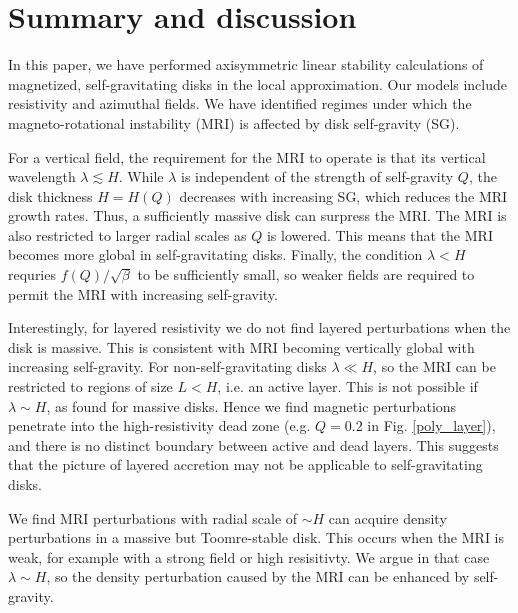 \section{Summary and discussion}\label{summary}
In this paper, we have performed axisymmetric linear stability
calculations of magnetized, self-gravitating disks in the local
approximation. Our models include resistivity and azimuthal fields.  
We have identified regimes under which the magneto-rotational
instability (MRI) is affected by disk self-gravity (SG).  

For a vertical field, the requirement for the MRI to operate is that its
vertical wavelength $\lambda \lesssim H$. While $\lambda$ is independent of
the strength of self-gravity $Q$, the disk thickness $H=H(Q)$ %
decreases with increasing SG, which reduces the MRI growth rates.   
Thus, a sufficiently massive disk can surpress the MRI. %
The MRI is also restricted to larger radial
scales as $Q$ is lowered. This means that the MRI becomes more global
in self-gravitating disks. Finally, the condition $\lambda < H$ 
requries $f(Q)/\sqrt{\beta}$ to be sufficiently small, so weaker
fields are required to permit the MRI with increasing self-gravity.   
 


Interestingly, for layered resistivity we do not find layered
perturbations when the disk is massive. This is 
consistent with MRI becoming vertically global with increasing self-gravity.    
For non-self-gravitating disks $\lambda\ll H$, so the MRI can be
restricted to regions of size $L<H$, i.e. an active layer. This is not
possible if $\lambda \sim H$, as found for massive disks. Hence we
find magnetic perturbations penetrate into the high-resistivity dead
zone (e.g. $Q=0.2$ in Fig. \ref{poly_layer}), and there is no distinct
boundary between active and dead layers. This suggests that the
picture of layered accretion  \citep[e.g.][]{fleming03} may not be applicable 
to self-gravitating disks.  %


We find MRI perturbations with radial scale of $\sim H$ can acquire  
density perturbations in a massive but Toomre-stable disk. 
This occurs when the MRI is weak, for example with a strong field or
high resisitivty. We argue in that case $\lambda\sim H$, so the density
perturbation caused by the MRI can be enhanced by self-gravity. 

